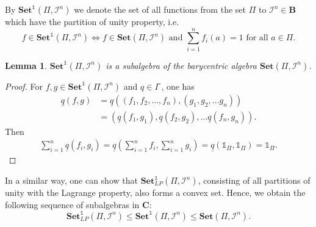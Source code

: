 \documentclass[12pt]{amsart}
\theoremstyle{plain}
\newtheorem{lemma}[theorem]{Lemma}
\theoremstyle{definition}
\numberwithin{equation}{section}
\begin{document}
By $\mathbf{Set}^{\mathds 1}(\Pi,\mathcal{I}^n)$ we denote the set of all functions from the set $\Pi$ to $\mathcal{I}^n\in\mathbf{B}$ which have the partition of unity property, i.e.
\begin{equation*}
f\in\mathbf{Set}^{\mathds 1}(\Pi,\mathcal{I}^n) \mathrel{\Leftrightarrow} f\in\mathbf{Set}(\Pi,\mathcal{I}^n) \text{ and } \sum_{i=1}^n f_i(a)=1 \text{ for all } a\in\Pi.
\end{equation*}

\begin{lemma}
$\mathbf{Set}^{\mathds 1}(\Pi,\mathcal{I}^n)$ is a subalgebra of the barycentric algebra $\mathbf{Set}(\Pi,\mathcal{I}^n)$.
\end{lemma}

\begin{proof}
For $f,g\in\mathbf{Set}^{\mathds 1}(\Pi,\mathcal{I}^n)$ and $q\in I^\circ$, one has
\begin{align*}
\underline{q}(f,g)&=\underline{q}\left((f_1,f_2,\ldots ,f_n),(g_1,g_2,\ldots g_n)\right)\\
&=\left(\underline{q}(f_1,g_1),\underline{q}(f_2,g_2),\ldots \underline{q}(f_n,g_n)\right).
\end{align*}
Then
\begin{align*}
\sum_{i=1}^{n}\underline{q}(f_i,g_i)=\underline{q}\left(\sum_{i=1}^{n}f_i,\sum_{i=1}^{n}g_i\right)=\underline{q}(\mathds 1_\Pi,\mathds 1_\Pi)=\mathds 1_\Pi.
\end{align*}
\end{proof}

In a similar way, one can show that $\mathbf{Set}_{LP}^{\mathds 1}(\Pi,\mathcal{I}^n)$, consisting of all partitions of unity with the Lagrange property, also forms a convex set. Hence, we obtain the following sequence of subalgebras in $\mathbf{C}$:
\begin{equation}\label{E:sequence}
\mathbf{Set}_{LP}^{\mathds 1}(\Pi,\mathcal{I}^n)\leq \mathbf{Set}^{\mathds 1}(\Pi,\mathcal{I}^n)\leq \mathbf{Set}(\Pi,\mathcal{I}^n).
\end{equation}
\end{document}
